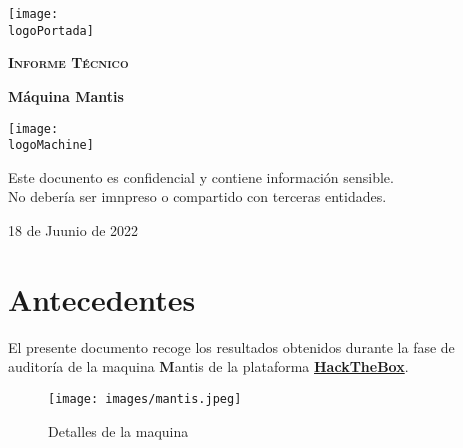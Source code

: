 \documentclass[a4paper]{article} %
\newcommand{\logoPortada}{images/logo_htb.png}
\newcommand{\machineName}{Mantis} %
\newcommand{\logoMachine}{images/mantis_logo.png} %
\newcommand{\startDate}{18 de Juunio de 2022} %
\begin{document}
    \cfoot{\thepage}
    \begin{titlepage}
    \centering
    \texttt{[image: \\logoPortada]}\par\vspace{1cm}
    {\scshape\LARGE \textbf{Informe Técnico}\par}
    \vspace{0.2cm}
    {\Huge\bfseries\textcolor{greeenPortada}{Máquina \machineName}\par}
    \vfill\vfill
    \texttt{[image: \\logoMachine]}\par\vspace{1cm}
    \vfill
    \begin{tcolorbox}[colback=red!5!white,colframe=red!75!black]
        \centering
        Este docunento es confidencial y contiene información sensible.
        \\No debería ser imnpreso o compartido con terceras entidades.
    \end{tcolorbox}
    \vfill
    {\large \startDate\par}
    \vfill
    \end{titlepage}
    \clearpage
    \tableofcontents
    \clearpage
    \section{Antecedentes}El presente documento recoge los 
    resultados obtenidos durante la fase de auditoría de la 
    maquina {\textbf\machineName} de la plataforma 
    \href{http://www.hackthebox.com}{\textbf{\color{blue}HackTheBox}}.
    \vspace{0.2cm}
    \begin{figure}[h]
    \centering
    \texttt{[image: images/mantis.jpeg]}
    \caption{Detalles de la maquina}
    \end{figure}
    \vspace{0.2cm}
    \begin{tcolorbox}[enhanced,attach boxed title to top center={yshift=-3mm,yshifttext=-1mm},
        colback=blue!5!white,colframe=blue!75!black,colbacktitle=greeenPortada!80!black,
        title=Dirección URL,fonttitle=\bfseries,
        boxed title style={size=small,colframe=red!50!black} ]
        \centering
        \href{https://hackthebox.es/home/machines/profile/98}{\color{blue}{https://hackthebox.es/home/machines/profile/98}}
    \end{tcolorbox}
    
\end{document}
